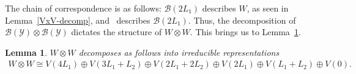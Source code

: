 \documentclass[pdftex]{sigma}
\numberwithin{equation}{section}
\newtheorem{Lemma}[Theorem]{Lemma}
\theoremstyle{definition}
\begin{document}
The chain of correspondence is as follows: $\mathcal{B}(2L_1)$ describes $W$, as seen in Lemma~\ref{VxV-decomp}, and~
describes $\mathcal{B}(2L_1)$. Thus, the decomposition of $\mathcal{B}(\mathcal{Y}) \otimes \mathcal{B}(\mathcal{Y})$ dictates the structure of $W \otimes W$. This brings us to Lemma~\ref{lemma-young}.
\begin{Lemma} \label{lemma-young} $W \otimes W$ decomposes as follows into irreducible representations
\begin{gather*}
 W \otimes W \cong V(4L_1) \oplus V(3L_1+L_2) \oplus V(2L_1+2L_2) \oplus V(2L_1) \oplus V(L_1+L_2) \oplus V(0).
\end{gather*}
\end{Lemma}
\end{document}
